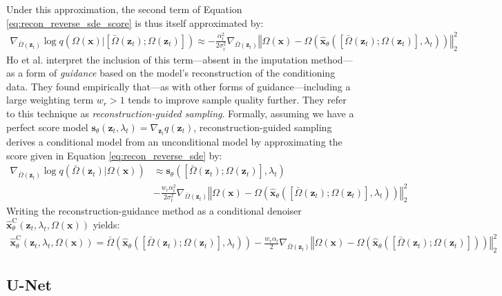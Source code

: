 \documentclass[ oneside,%
                    author={George Herbert},
                    degree={MSci},
                     title={Diffusion Models for Time-Evolving Precipitation Fields},
                  subtitle={}]{dissertation}
\begin{document}
Under this approximation, the second term of Equation \ref{eq:recon_reverse_sde_score} is thus itself approximated by:
\begin{align}
      \nabla_{\bar\Omega(\mathbf{z}_t)} \log q(\Omega(\mathbf{x})|[\bar\Omega(\mathbf{z}_t); \Omega(\mathbf{z}_t)])\approx-\frac{\alpha_t^2}{2\sigma_t^2}\nabla_{\bar\Omega(\mathbf{z}_t)} \left\Vert \Omega(\mathbf{x}) - \Omega\left(\hat{\mathbf{x}}_\theta\left([\bar\Omega(\mathbf{z}_t); \Omega(\mathbf{z}_t)], \lambda_t \right)\right)\right\Vert_2^2
\end{align}
Ho et al. \cite{VDM_Ho} interpret the inclusion of this term---absent in the imputation method---as a form of \textit{guidance} based on the model's reconstruction of the conditioning data. They found empirically that---as with other forms of guidance---including a large weighting term $w_r>1$ tends to improve sample quality further. They refer to this technique as \textit{reconstruction-guided sampling}. Formally, assuming we have a perfect score model $\mathbf{s}_\theta(\mathbf{z}_t, \lambda_t)=\nabla_{\mathbf{z}_t} q(\mathbf{z}_t)$, reconstruction-guided sampling derives a conditional model from an unconditional model by approximating the score given in Equation \ref{eq:recon_reverse_sde} by:
\begin{align}
      \nabla_{\bar\Omega(\mathbf{z}_t)}\log q(\bar\Omega(\mathbf{z}_t)|\Omega(\mathbf{x}))&\approx \mathbf{s}_\theta ([\bar\Omega(\mathbf{z}_t); \Omega(\mathbf{z}_t)], \lambda_t)\\&-\frac{w_r\alpha_t^2}{2\sigma_t^2}\nabla_{\bar\Omega(\mathbf{z}_t)} \left\Vert \Omega(\mathbf{x}) - \Omega\left(\hat{\mathbf{x}}_\theta\left([\bar\Omega(\mathbf{z}_t); \Omega(\mathbf{z}_t)], \lambda_t \right)\right)\right\Vert_2^2
\end{align}
Writing the reconstruction-guidance method as a conditional denoiser $\hat{\mathbf{x}}^{\mathrm{C}}_\theta(\mathbf{z}_t, \lambda_t, \Omega(\mathbf{x}))$ yields:
\begin{align}
      \hat{\mathbf{x}}^{\mathrm{C}}_\theta(\mathbf{z}_t, \lambda_t, \Omega(\mathbf{x}))=\bar\Omega\left(\hat{\mathbf{x}}_\theta([\bar\Omega(\mathbf{z}_t); \Omega(\mathbf{z}_t)], \lambda_t )\right) - \frac{w_r\alpha_t}{2}\nabla_{\bar\Omega(\mathbf{z}_t)} \left\Vert \Omega(\mathbf{x}) - \Omega\left(\hat{\mathbf{x}}_\theta\left([\bar\Omega(\mathbf{z}_t); \Omega(\mathbf{z}_t)]\right)\right)\right\Vert_2^2
\end{align}

\subsection{U-Net}
\label{sec:background_unet}
\end{document}
